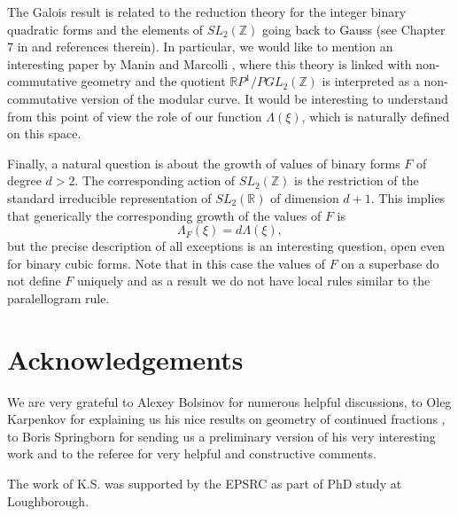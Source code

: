 \documentclass[11pt,reqno]{amsart}
\begin{document}
The Galois result is related to the reduction theory for the integer binary quadratic forms and the elements of $SL_2(\mathbb Z)$ going back to Gauss (see Chapter 7 in \cite{Karp} and references therein). In particular, we would like to mention an interesting paper by Manin and Marcolli \cite{MM}, where this theory is linked with non-commutative geometry and the quotient $\mathbb{R}P^1/PGL_2(\mathbb Z)$ is interpreted as a non-commutative version of the modular curve. It would be interesting to understand from this point of view the role of our function $\Lambda(\xi)$, which is naturally defined on this space.


Finally, a natural question is about the growth of values of binary forms $F$ of degree $d>2$. The corresponding action of $SL_2(\mathbb Z)$ is the restriction of the standard irreducible representation of $SL_2(\mathbb R)$ of dimension $d+1.$
This implies that generically the corresponding growth of the values of $F$ is 
$$
\Lambda_F(\xi)=d \Lambda(\xi),
$$
but the precise description of all exceptions is an interesting question, open even for binary cubic forms.
Note that in this case the values of $F$ on a superbase do not define $F$ uniquely and as a result we do not have local rules similar to the paralellogram rule.

\section{Acknowledgements}

We are very grateful to Alexey Bolsinov for numerous helpful discussions, to Oleg Karpenkov for explaining us his nice results on geometry of continued fractions \cite{Karp}, to Boris Springborn for sending us a preliminary version of his very interesting work \cite{Springborn} and to the referee for very helpful and constructive comments.

The work of K.S. was supported by the EPSRC as part of PhD study at Loughborough.
\end{document}
